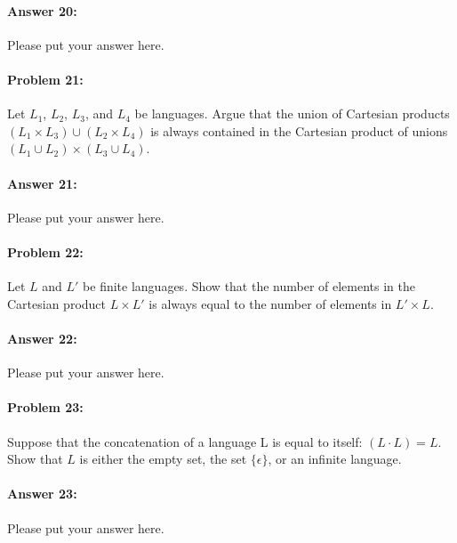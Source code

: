 \documentclass[10pt]{article}
\begin{document}
\paragraph{Answer 20:} Please put your answer here.

\noindent\hrulefill %

\paragraph{Problem 21:}
Let $L_1$, $L_2$, $L_3$, and $L_4$ be languages. Argue that the union
of Cartesian products $(L_1 \times L_3) \cup (L_2 \times L_4)$ is
always contained in the Cartesian product of unions
$(L_1 \cup L_2) \times (L_3 \cup L_4)$.

\paragraph{Answer 21:} Please put your answer here.

\noindent\hrulefill %

\paragraph{Problem 22:}
Let $L$ and $L'$ be finite languages. Show that the number of elements
in the Cartesian product $L \times L'$ is always equal to the number
of elements in $L' \times L$.

\paragraph{Answer 22:} Please put your answer here.

\noindent\hrulefill %

\paragraph{Problem 23:}

Suppose that the concatenation of a language L is equal to itself:
$(L\cdot L) = L$. Show that $L$ is either the empty set, 
the set $\{\epsilon\}$, or an infinite language.

\paragraph{Answer 23:} Please put your answer here.
\end{document}
